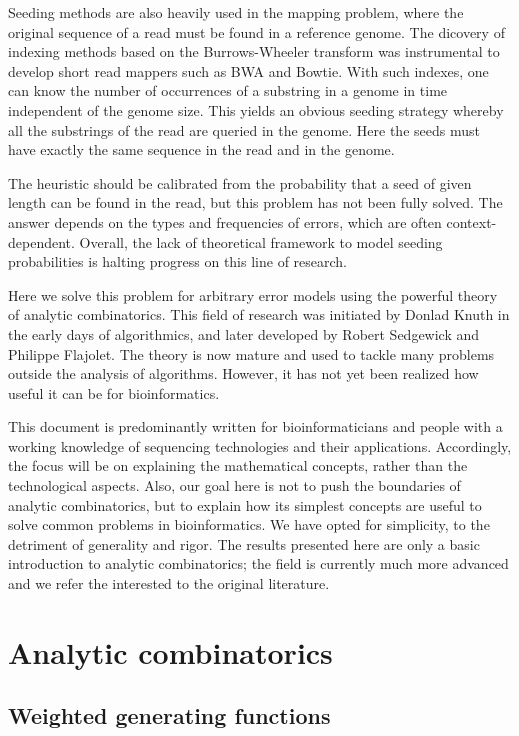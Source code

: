 \documentclass{article}
\begin{document}
Seeding methods are also heavily used in the mapping problem, where the
original sequence of a read must be found in a reference genome. The
dicovery of indexing methods based on the Burrows-Wheeler transform was
instrumental to develop short read mappers such as BWA and Bowtie. With
such indexes, one can know the number of occurrences of a substring in a
genome in time independent of the genome size. This yields an obvious
seeding strategy whereby all the substrings of the read are queried in the
genome. Here the seeds must have exactly the same sequence in the read and
in the genome.

The heuristic should be calibrated from the probability that a seed of
given length can be found in the read, but this problem has not been fully
solved. The answer depends on the types and frequencies of errors, which
are often context-dependent. Overall, the lack of theoretical framework to
model seeding probabilities is halting progress on this line of research.

Here we solve this problem for arbitrary error models using the powerful
theory of analytic combinatorics. This field of research was initiated by
Donlad Knuth in the early days of algorithmics, and later developed by
Robert Sedgewick and Philippe Flajolet. The theory is now mature and used
to tackle many problems outside the analysis of algorithms. However, it
has not yet been realized how useful it can be for bioinformatics.

This document is predominantly written for bioinformaticians and people
with a working knowledge of sequencing technologies and their applications.
Accordingly, the focus will be on explaining the mathematical concepts,
rather than the technological aspects. Also, our goal here is not to push
the boundaries of analytic combinatorics, but to explain how its simplest
concepts are useful to solve common problems in bioinformatics. We have
opted for simplicity, to the detriment of generality and rigor. The
results presented here are only a basic introduction to analytic
combinatorics; the field is currently much more advanced and we refer the
interested to the original literature.

\section{Analytic combinatorics}
\label{sec:anal}

\subsection{Weighted generating functions}
\label{subsec:WGF}
\end{document}
